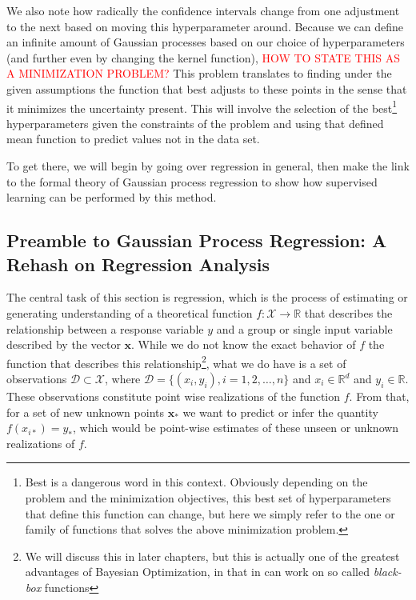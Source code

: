 We also note how radically the confidence intervals change from one adjustment to the next based on moving this hyperparameter around. Because we can define an infinite amount of Gaussian processes based on our choice of hyperparameters (and further even by changing the kernel function), \textcolor{red}{HOW TO STATE THIS AS A MINIMIZATION PROBLEM?}
This problem translates to finding under the given assumptions the function that best adjusts to these points in the sense that it minimizes the uncertainty present. This will involve the selection of the best\footnote{Best is a dangerous word in this context. Obviously depending on the problem and the minimization objectives, this best set of hyperparameters that define this function can change, but here we simply refer to the one or family of functions that solves the above minimization problem.} hyperparameters given the constraints of the problem and using that defined mean function to predict values not in the data set.

To get there, we will begin by going over regression in general, then make the link to the formal theory of Gaussian process regression to show how supervised learning can be performed by this method. 

\subsection{Preamble to Gaussian Process Regression: A Rehash on Regression Analysis}

The central task of this section is regression, which is the process of estimating or generating understanding of a theoretical function $f: \mathcal{X} \rightarrow \mathbb{R}$ that describes the relationship between a response variable $y$ and a group or single input variable described by the vector $\boldsymbol{x}$. While we do not know the exact behavior of $f$ the function that describes this relationship\footnote{We will discuss this in later chapters, but this is actually one of the greatest advantages of Bayesian Optimization, in that in can work on so called \textit{black-box} functions}, what we do have is a set of observations $\mathcal{D} \subset \mathcal{X}$, where $\mathcal{D} = \{ (x_i, y_i), i = 1,2,\ldots, n \}$ and $x_i \in \mathbb{R}^d$ and $y_i \in \mathbb{R}$. These observations constitute point wise realizations of the function $f$. From that, for a set of new unknown points $\boldsymbol{x}_*$ we want to predict or infer the quantity $f(x_{i*}) = y_*$, which would be point-wise estimates of these unseen or unknown realizations of $f$. 

